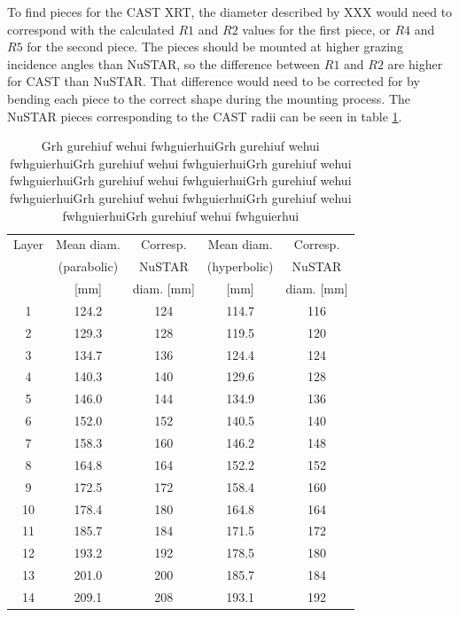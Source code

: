 To find pieces for the CAST XRT, the diameter described by XXX would need to correspond with the calculated $\mathit{R1}$ and $\mathit{R2}$ values for the first piece, or $\mathit{R4}$ and $\mathit{R5}$ for the second piece. The pieces should be mounted at higher grazing incidence angles than NuSTAR, so the difference between $\mathit{R1}$ and $\mathit{R2}$ are higher for CAST than NuSTAR. That difference would need to be corrected for by bending each piece to the correct shape during the mounting process. The NuSTAR pieces corresponding to the CAST radii can be seen in table \ref{tab:cast_pieces}.

\begin{table}[p]
\begin{center}
\begin{tabular}{c|c|c|c|c}
Layer & Mean diam. & Corresp. & Mean diam. & Corresp. \\
& (parabolic)  & NuSTAR & (hyperbolic)  & NuSTAR  \\
& [mm] &  diam. [mm] & [mm] &  diam. [mm]\\
\hline
1&124.2&124&114.7&116\\
2&129.3&128&119.5&120\\
3&134.7&136&124.4&124\\
4&140.3&140&129.6&128\\
5&146.0&144&134.9&136\\
6&152.0&152&140.5&140\\
7&158.3&160&146.2&148\\
8&164.8&164&152.2&152\\
9&172.5&172&158.4&160\\
10&178.4&180&164.8&164\\
11&185.7&184&171.5&172\\
12&193.2&192&178.5&180\\
13&201.0&200&185.7&184\\
14&209.1&208&193.1&192
\end{tabular}
\end{center}
\caption{\footnotesize Grh gurehiuf wehui fwhguierhuiGrh gurehiuf wehui fwhguierhuiGrh gurehiuf wehui fwhguierhuiGrh gurehiuf wehui fwhguierhuiGrh gurehiuf wehui fwhguierhuiGrh gurehiuf wehui fwhguierhuiGrh gurehiuf wehui fwhguierhuiGrh gurehiuf wehui fwhguierhuiGrh gurehiuf wehui fwhguierhui}\label{tab:cast_pieces}
\end{table}

